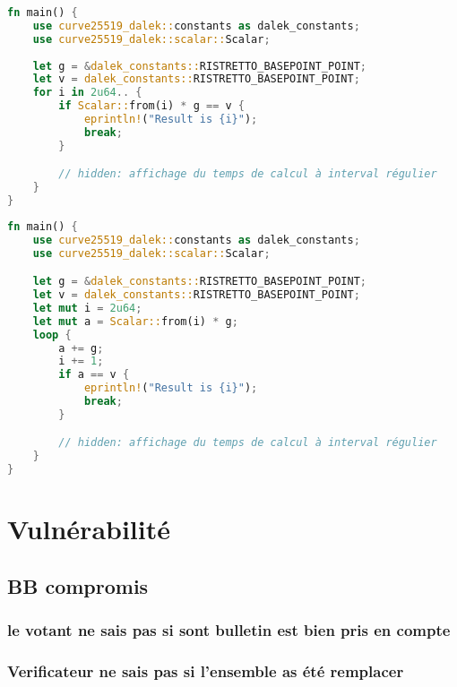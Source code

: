 \documentclass[../report]{subfiles}
\begin{document}

\begin{lstlisting}[language=Rust,caption={Vitesse de calcul résultat final (très naif)},style=numbers,label={lst:perf:resultat-1}]
fn main() {
    use curve25519_dalek::constants as dalek_constants;
    use curve25519_dalek::scalar::Scalar;
        
    let g = &dalek_constants::RISTRETTO_BASEPOINT_POINT;
    let v = dalek_constants::RISTRETTO_BASEPOINT_POINT;
    for i in 2u64.. {
        if Scalar::from(i) * g == v {
            eprintln!("Result is {i}");
            break;
        }

        // hidden: affichage du temps de calcul à interval régulier
    }
}
\end{lstlisting}%
\begin{lstlisting}[language=Rust,caption={Vitesse de calcul résultat final (un peu moins naif)},style=numbers,label={lst:perf:resultat-2}]
fn main() {
    use curve25519_dalek::constants as dalek_constants;
    use curve25519_dalek::scalar::Scalar;

    let g = &dalek_constants::RISTRETTO_BASEPOINT_POINT;
    let v = dalek_constants::RISTRETTO_BASEPOINT_POINT;
    let mut i = 2u64;
    let mut a = Scalar::from(i) * g;
    loop {
        a += g;
        i += 1;
        if a == v {
            eprintln!("Result is {i}");
            break;
        }

        // hidden: affichage du temps de calcul à interval régulier
    }
}
\end{lstlisting}%

\chapter{Vulnérabilité}

\section{BB compromis}

\subsection{le votant ne sais pas si sont bulletin est bien pris en compte}
\subsection{Verificateur ne sais pas si l'ensemble as été remplacer}
\end{document}
